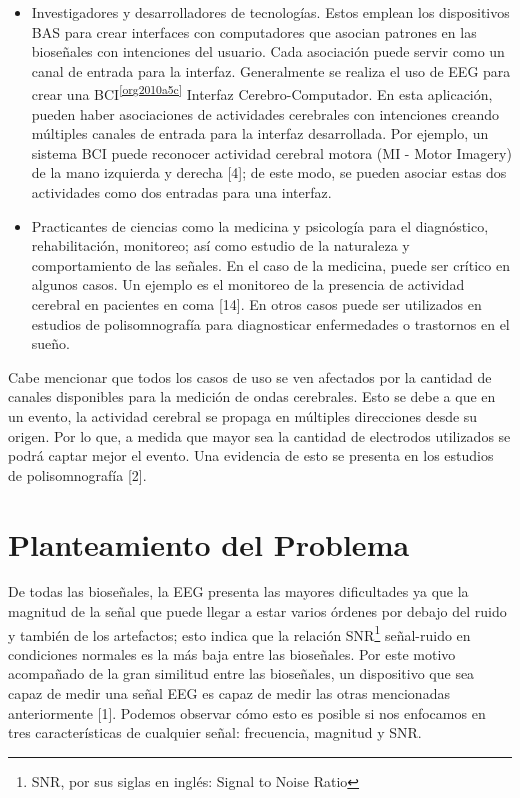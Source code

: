 \begin{itemize}
\item Investigadores y desarrolladores de tecnologías. Estos emplean los dispositivos BAS para crear interfaces con computadores que asocian patrones en las bioseñales con intenciones del usuario. Cada asociación puede servir como un canal de entrada para la interfaz. Generalmente se realiza el uso de EEG para crear una BCI\textsuperscript{\ref{org2010a5c}} Interfaz Cerebro-Computador. En esta aplicación, pueden haber asociaciones de actividades cerebrales con intenciones creando múltiples canales de entrada para la interfaz desarrollada. Por ejemplo, un sistema BCI puede reconocer actividad cerebral motora (MI - Motor Imagery) de la mano izquierda y derecha [4]; de este modo, se pueden asociar estas dos actividades como dos entradas para una interfaz.

\item Practicantes de ciencias como la medicina y psicología para el diagnóstico, rehabilitación, monitoreo; así como estudio de la naturaleza y comportamiento de las señales. En el caso de la medicina, puede ser crítico en algunos casos. Un ejemplo es el monitoreo de la presencia de actividad cerebral en pacientes en coma [14]. En otros casos puede ser utilizados en estudios de polisomnografía para diagnosticar enfermedades o trastornos en el sueño.
\end{itemize}

Cabe mencionar que todos los casos de uso se ven afectados por la cantidad de canales disponibles para la medición de ondas cerebrales. Esto se debe a que en un evento, la actividad cerebral se propaga en múltiples direcciones desde su origen. Por lo que, a medida que mayor sea la cantidad de electrodos utilizados se podrá captar mejor el evento. Una evidencia de esto se presenta en los estudios de polisomnografía [2].

\section{Planteamiento del Problema}
\label{sec:org3aff47d}
De todas las bioseñales, la EEG presenta las mayores dificultades ya que la magnitud de la señal que puede llegar a estar varios órdenes por debajo del ruido y también de los artefactos; esto indica que la relación SNR\footnote{SNR, por sus siglas en inglés: Signal to Noise Ratio} señal-ruido en condiciones normales es la más baja entre las bioseñales. Por este motivo acompañado de la gran similitud entre las bioseñales, un dispositivo que sea capaz de medir una señal EEG es capaz de medir las otras mencionadas anteriormente [1]. Podemos observar cómo esto es posible si nos enfocamos en tres características de cualquier señal: frecuencia, magnitud y SNR.

